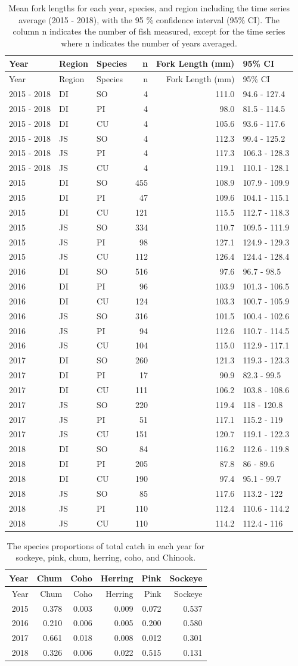 \documentclass[fleqn,10pt]{wlpeerj} %
\begin{document}
\begin{longtable}[]{@{}lllrrl@{}}
\caption{\label{tab:length-table} Mean fork lengths for each year, species,
and region including the time series average (2015 - 2018), with the 95
\% confidence interval (95\% CI). The column n indicates the number of
fish measured, except for the time series where n indicates the number
of years averaged.}\tabularnewline
\toprule
Year & Region & Species & n & Fork Length (mm) & 95\% CI\tabularnewline
\midrule
\endfirsthead
\toprule
Year & Region & Species & n & Fork Length (mm) & 95\% CI\tabularnewline
\midrule
\endhead
2015 - 2018 & DI & SO & 4 & 111.0 & 94.6 - 127.4\tabularnewline
2015 - 2018 & DI & PI & 4 & 98.0 & 81.5 - 114.5\tabularnewline
2015 - 2018 & DI & CU & 4 & 105.6 & 93.6 - 117.6\tabularnewline
2015 - 2018 & JS & SO & 4 & 112.3 & 99.4 - 125.2\tabularnewline
2015 - 2018 & JS & PI & 4 & 117.3 & 106.3 - 128.3\tabularnewline
2015 - 2018 & JS & CU & 4 & 119.1 & 110.1 - 128.1\tabularnewline
2015 & DI & SO & 455 & 108.9 & 107.9 - 109.9\tabularnewline
2015 & DI & PI & 47 & 109.6 & 104.1 - 115.1\tabularnewline
2015 & DI & CU & 121 & 115.5 & 112.7 - 118.3\tabularnewline
2015 & JS & SO & 334 & 110.7 & 109.5 - 111.9\tabularnewline
2015 & JS & PI & 98 & 127.1 & 124.9 - 129.3\tabularnewline
2015 & JS & CU & 112 & 126.4 & 124.4 - 128.4\tabularnewline
2016 & DI & SO & 516 & 97.6 & 96.7 - 98.5\tabularnewline
2016 & DI & PI & 96 & 103.9 & 101.3 - 106.5\tabularnewline
2016 & DI & CU & 124 & 103.3 & 100.7 - 105.9\tabularnewline
2016 & JS & SO & 316 & 101.5 & 100.4 - 102.6\tabularnewline
2016 & JS & PI & 94 & 112.6 & 110.7 - 114.5\tabularnewline
2016 & JS & CU & 104 & 115.0 & 112.9 - 117.1\tabularnewline
2017 & DI & SO & 260 & 121.3 & 119.3 - 123.3\tabularnewline
2017 & DI & PI & 17 & 90.9 & 82.3 - 99.5\tabularnewline
2017 & DI & CU & 111 & 106.2 & 103.8 - 108.6\tabularnewline
2017 & JS & SO & 220 & 119.4 & 118 - 120.8\tabularnewline
2017 & JS & PI & 51 & 117.1 & 115.2 - 119\tabularnewline
2017 & JS & CU & 151 & 120.7 & 119.1 - 122.3\tabularnewline
2018 & DI & SO & 84 & 116.2 & 112.6 - 119.8\tabularnewline
2018 & DI & PI & 205 & 87.8 & 86 - 89.6\tabularnewline
2018 & DI & CU & 190 & 97.4 & 95.1 - 99.7\tabularnewline
2018 & JS & SO & 85 & 117.6 & 113.2 - 122\tabularnewline
2018 & JS & PI & 110 & 112.4 & 110.6 - 114.2\tabularnewline
2018 & JS & CU & 110 & 114.2 & 112.4 - 116\tabularnewline
\bottomrule
\end{longtable}

\begin{longtable}[]{@{}rrrrrr@{}}
\caption{\label{tab:proportion-table} The species proportions of total catch
in each year for sockeye, pink, chum, herring, coho, and
Chinook.}\tabularnewline
\toprule
Year & Chum & Coho & Herring & Pink & Sockeye\tabularnewline
\midrule
\endfirsthead
\toprule
Year & Chum & Coho & Herring & Pink & Sockeye\tabularnewline
\midrule
\endhead
2015 & 0.378 & 0.003 & 0.009 & 0.072 & 0.537\tabularnewline
2016 & 0.210 & 0.006 & 0.005 & 0.200 & 0.580\tabularnewline
2017 & 0.661 & 0.018 & 0.008 & 0.012 & 0.301\tabularnewline
2018 & 0.326 & 0.006 & 0.022 & 0.515 & 0.131\tabularnewline
\bottomrule
\end{longtable}
\end{document}
